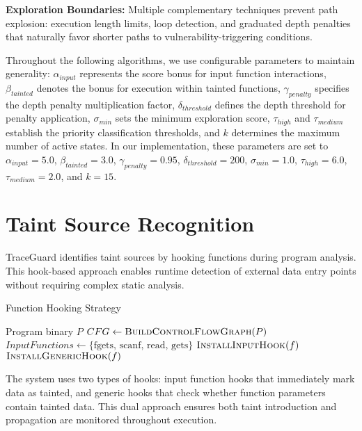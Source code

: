 \textbf{Exploration Boundaries:} Multiple complementary techniques prevent path explosion: execution length limits, loop detection, and graduated depth penalties that naturally favor shorter paths to vulnerability-triggering conditions.

\vspace{1em}

Throughout the following algorithms, we use configurable parameters to maintain generality: $\alpha_{input}$ represents the score bonus for input function interactions, $\beta_{tainted}$ denotes the bonus for execution within tainted functions, $\gamma_{penalty}$ specifies the depth penalty multiplication factor, $\delta_{threshold}$ defines the depth threshold for penalty application, $\sigma_{min}$ sets the minimum exploration score, $\tau_{high}$ and $\tau_{medium}$ establish the priority classification thresholds, and $k$ determines the maximum number of active states. In our implementation, these parameters are set to $\alpha_{input} = 5.0$, $\beta_{tainted} = 3.0$, $\gamma_{penalty} = 0.95$, $\delta_{threshold} = 200$, $\sigma_{min} = 1.0$, $\tau_{high} = 6.0$, $\tau_{medium} = 2.0$, and $k = 15$.

\section{Taint Source Recognition}

TraceGuard identifies taint sources by hooking functions during program analysis. This hook-based approach enables runtime detection of external data entry points without requiring complex static analysis.

\begin{algorithm}[H]
\caption{Function Hooking Strategy}
\begin{algorithmic}[1]
\Require Program binary $P$
\State $CFG \gets \textsc{BuildControlFlowGraph}(P)$
\State $InputFunctions \gets \{\text{fgets, scanf, read, gets}\}$
        \State $\textsc{InstallInputHook}(f)$
    \Else
        \State $\textsc{InstallGenericHook}(f)$
    \EndIf
\EndFor
\end{algorithmic}
\end{algorithm}

The system uses two types of hooks: input function hooks that immediately mark data as tainted, and generic hooks that check whether function parameters contain tainted data. This dual approach ensures both taint introduction and propagation are monitored throughout execution.

